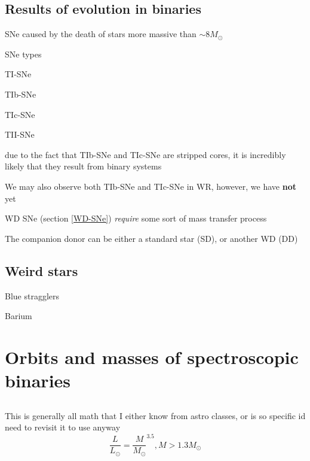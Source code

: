 \documentclass{article}
\begin{document}
\subsection{Results of evolution in binaries}
\begin{list}{-}{}
\item SNe caused by the death of stars more massive than \(\sim8M_\odot\)
\item SNe types
\begin{list}{-}{}
\item \gls{TI-SNe}
\item \gls{TIb-SNe}
\item \gls{TIc-SNe}
\item \gls{TII-SNe} 
\end{list}
\item due to the fact that \gls{TIb-SNe} and \gls{TIc-SNe} are stripped cores, it is incredibly likely that they result from binary systems
\item We may also observe both \gls{TIb-SNe} and \gls{TIc-SNe} in \gls{WR}, however, we have \textbf{not} yet
\item WD SNe (section \ref{WD-SNe}) \textit{require} some sort of mass transfer process
\item The companion donor can be either a standard star (\gls{SD}), or another WD (\gls{DD})
\end{list}

\subsection{Weird stars}
\begin{list}{-}{}
\item Blue stragglers
\item Barium 
\end{list}


\section{Orbits and masses of spectroscopic binaries}
\setcounter{subsection}{3}
\subsection{}
This is generally all math that I either know from astro classes, or is so specific id need to revisit it to use anyway\\

\[\frac{L}{L_\odot} = \frac{M}{M_\odot}^{3.5}, M > 1.3M_\odot\]
\end{document}
